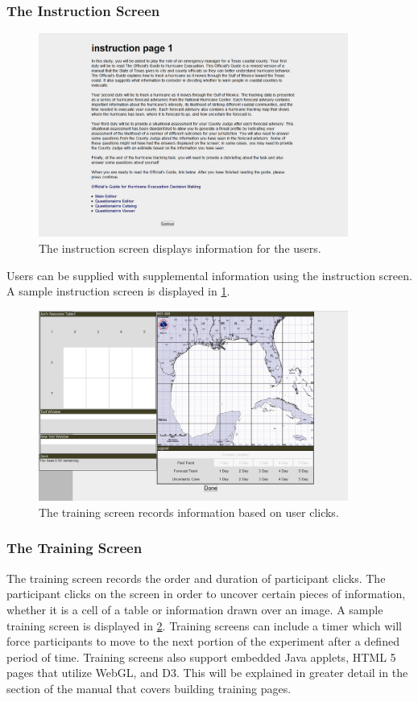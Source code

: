 \documentclass[article]{ij4uq}              %
\begin{document}
\subsubsection{The Instruction Screen}

\begin{figure}[h!]
 \centering
 \includegraphics[width=4.0in]{figures/instruction_page.png}
 \caption{The instruction screen displays information for the users.}
 \label{fig:inst}
\end{figure}
\FloatBarrier

Users can be supplied with supplemental information using the instruction screen. A sample instruction screen is displayed in \ref{fig:inst}. 

\begin{figure}[h!]
 \centering
 \includegraphics[width=4.0in]{figures/training_page.png}
 \caption{The training screen records information based on user clicks.}
 \label{fig:train}
\end{figure}
\FloatBarrier

\subsubsection{The Training Screen}

The training screen records the order and duration of participant clicks. The participant clicks on the screen in order to uncover certain pieces of information, whether it is a cell of a table or information drawn over an image. A sample training screen is displayed in \ref{fig:train}.  Training screens can include a timer which will force participants to move to the next portion of the experiment after a defined period of time.  Training screens also support embedded Java applets, HTML 5 pages that utilize WebGL, and D3.  This will be explained in greater detail in the section of the manual that covers building training pages.
\end{document}
